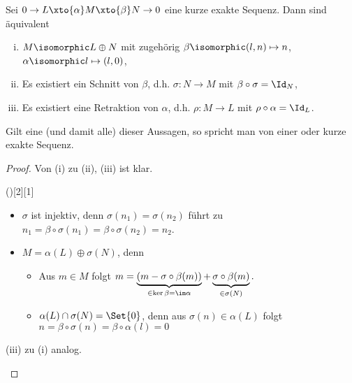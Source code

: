 \begin{st}
    Sei $0 \to L \xto{\alpha} M \xto{\beta} N \to 0$ eine kurze exakte Sequenz.
    Dann sind äquivalent
    \begin{enumerate}[(i)]
        \item
            $M \isomorphic L \oplus N$ mit zugehörig $\beta \isomorphic (l, n) \mapsto n$, $\alpha \isomorphic l \mapsto (l, 0)$,
        \item
            Es existiert ein Schnitt von $\beta$, d.h. $\sigma: N \to M$ mit $\beta \circ \sigma = \Id_N$,
        \item
            Es existiert eine Retraktion von $\alpha$, d.h. $\rho: M \to L$ mit $\rho \circ \alpha = \Id_L$.
    \end{enumerate}
    Gilt eine (und damit alle) dieser Aussagen, so spricht man von einer  oder  kurze exakte Sequenz.
    \begin{proof}
        Von (i) zu (ii), (iii) ist klar.
        \begin{seg}{\ProofImplication()[2][1]}
            \begin{itemize}
                \item
                    $\sigma$ ist injektiv, denn $\sigma(n_1) = \sigma(n_2)$ führt zu $n_1 = \beta \circ \sigma(n_1) = \beta \circ \sigma(n_2) = n_2$.
                \item
                    $M = \alpha(L) \oplus \sigma(N)$, denn
                    \begin{itemize}
                        \item
                            Aus $m \in M$ folgt
                            \begin{math}
                                m = \underbrace{(m - \sigma \circ \beta(m))}_{\in \ker \beta = \im \alpha} + \underbrace{\sigma \circ \beta(m)}_{\in \sigma(N)}.
                            \end{math}
                        \item
                            $\alpha(L) \cap \sigma(N) = \Set{0}$, denn aus $\sigma(n) \in \alpha(L)$ folgt $n = \beta \circ \sigma(n) = \beta \circ \alpha(l) = 0$
                    \end{itemize}
            \end{itemize}
            (iii) zu (i) analog.
        \end{seg}
    \end{proof}
\end{st}

